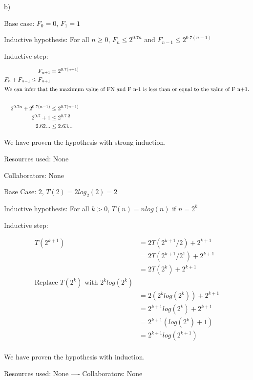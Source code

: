 \documentclass[11pt,largemargins]{homework}
\begin{document}
b)

Base case: $F_0 = 0$, $F_1 = 1$

Inductive hypothesis: For all $n \geq 0$, $F_n \leq 2^{0.7n}$ and $F_{n - 1} \leq 2^{0.7(n - 1)}$

Inductive step:

\begin{align*}
  F_{n + 1} &= 2^{0.7(n + 1)} \\
  F_n + F_{n - 1} \leq F_{n + 1} \\
  \intertext{We can infer that the maximum value of FN and F n-1 is less than or equal to the value of F n+1.} \\
  2^{0.7n} + 2^{0.7(n - 1)} &\leq 2^{0.7(n + 1)} \\
  2^{0.7} + 1 &\leq 2^{0.7 \cdot 2} \\
  2.62... &\leq 2.63... \\
\end{align*}


We have proven the hypothesis with strong induction.

\newpage
\question
Resources used: None

Collaborators: None

Base Case: 2, $T(2) = 2log_2(2) = 2$

Inductive hypothesis: For all $k > 0$, $T(n) = nlog(n)$ if $n = 2^k$

Inductive step:

\begin{align*}
  T(2^{k+1}) &= 2T(2^{k+1}/2) + 2^{k+1} \\
  &= 2T(2^{k+1}/2^1) + 2^{k+1} \\
  &= 2T(2^k) + 2^{k+1} \\
  \text {Replace $T(2^k)$ with $2^klog(2^k)$} \\
  &= 2(2^klog(2^k)) + 2^{k+1} \\
  &= 2^{k+1}log(2^k) + 2^{k+1} \\
  &= 2^{k+1}(log(2^k) + 1) \\
  &= 2^{k+1}log(2^{k+1}) \\
\end{align*}

We have proven the hypothesis with induction.



\newpage
\question
Resources used: None ---- Collaborators: None
\end{document}
